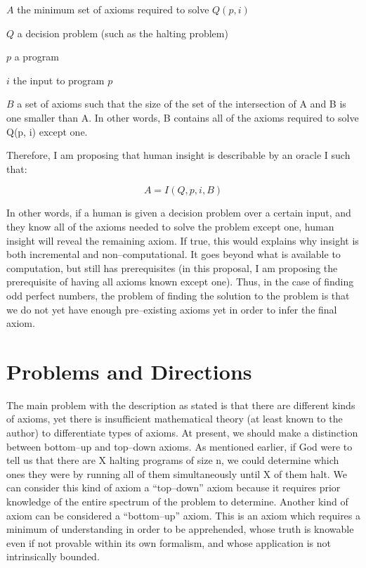 \begin{description}
\item{$A$}
the minimum set of axioms required to solve $Q(p, i)$

\item{$Q$}
a decision problem (such as the halting problem)

\item{$p$}
a program

\item{$i$} 
the input to program $p$

\item{$B$}
a set of axioms such that the size of the set of the intersection of A and B is one smaller than A.  In other words, B contains all of the axioms required to solve Q(p, i) except one.
\end{description}

Therefore, I am proposing that human insight is describable by an oracle I such that:

$$ A = I(Q, p, i, B) $$

In other words, if a human is given a decision problem over a certain input, and they know all of the axioms needed to solve the problem except one, human insight will reveal the remaining axiom.  If true, this would explains why insight is both incremental and non--computational.  It goes beyond what is available to computation, but still has prerequisites (in this proposal, I am proposing the prerequisite of having all axioms known except one).  Thus, in the case of finding odd perfect numbers, the problem of finding the solution to the problem is that we do not yet have enough pre--existing axioms yet in order to infer the final axiom.

\section{Problems and Directions}

The main problem with the description as stated is that there are different kinds of axioms, yet there is insufficient mathematical theory (at least known to the author) to differentiate types of axioms.  At present, we should make a distinction between bottom--up and top--down axioms.  As mentioned earlier, if God were to tell us that there are X halting programs of size n, we could determine which ones they were by running all of them simultaneously until X of them halt.  We can consider this kind of axiom a ``top--down'' axiom because it requires prior knowledge of the entire spectrum of the problem to determine.  Another kind of axiom can be considered a ``bottom--up'' axiom.  This is an axiom which requires a minimum of understanding in order to be apprehended, whose truth is knowable even if not provable within its own formalism, and whose application is not intrinsically bounded.  

